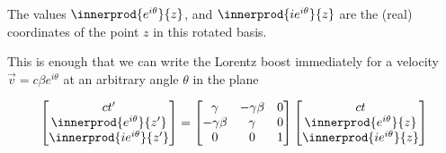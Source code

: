 The values $\innerprod{e^{i \theta}}{z}$, and $\innerprod{i e^{i\theta} }{z}$ are the (real) coordinates of the point $z$ in this rotated basis.

This is enough that we can write the Lorentz boost immediately for a velocity $\vec{v} = c \beta e^{i\theta}$ at an arbitrary angle $\theta$ in the plane

\begin{equation}\label{eqn:complexPlanarBoost:n}
\begin{bmatrix}
ct' \\
\innerprod{e^{i\theta}}{z'} \\
\innerprod{i e^{i\theta}}{z'} 
\end{bmatrix}
=
\begin{bmatrix}
\gamma & -\gamma \beta & 0 \\
-\gamma \beta & \gamma & 0 \\
0 & 0 & 1
\end{bmatrix}
\begin{bmatrix}
ct \\
\innerprod{e^{i\theta}}{z} \\
\innerprod{i e^{i\theta}}{z} 
\end{bmatrix}
\end{equation}

\EndArticle
